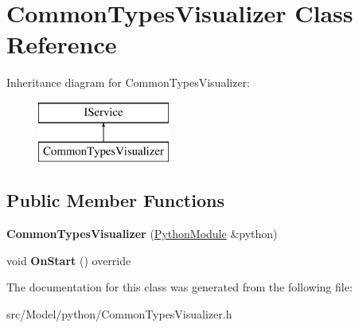 \hypertarget{classCommonTypesVisualizer}{}\section{Common\+Types\+Visualizer Class Reference}
\label{classCommonTypesVisualizer}
Inheritance diagram for Common\+Types\+Visualizer\+:\begin{figure}[H]
\begin{center}
\leavevmode
\includegraphics[height=2.000000cm]{classCommonTypesVisualizer}
\end{center}
\end{figure}
\subsection*{Public Member Functions}
\begin{DoxyCompactItemize}
\item 
{\bfseries Common\+Types\+Visualizer} (\hyperlink{classPythonModule}{Python\+Module} \&python)\hypertarget{classCommonTypesVisualizer_a30da44a28c61f4b5cb1549bc95ac1d0a}{}\label{classCommonTypesVisualizer_a30da44a28c61f4b5cb1549bc95ac1d0a}

\item 
void {\bfseries On\+Start} () override\hypertarget{classCommonTypesVisualizer_ac6f33a59769e00936e783f1a44f6c364}{}\label{classCommonTypesVisualizer_ac6f33a59769e00936e783f1a44f6c364}

\end{DoxyCompactItemize}


The documentation for this class was generated from the following file\+:\begin{DoxyCompactItemize}
\item 
src/\+Model/python/Common\+Types\+Visualizer.\+h\end{DoxyCompactItemize}
